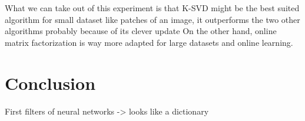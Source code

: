 \documentclass[a4paper,11pt]{article}
\begin{document}
What we can take out of this experiment is that K-SVD might be the best suited algorithm for small dataset like patches of an image, it outperforms the two other algorithms probably because of its clever update
On the other hand, online matrix factorization is way more adapted for large datasets and online learning.
\section{Conclusion}
First filters of neural networks -> looks like a dictionary
\end{document}

